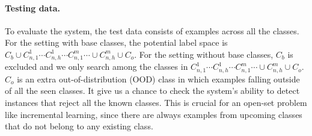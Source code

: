 \documentclass[11pt]{article}
\begin{document}
\paragraph{Testing data.}
To evaluate the system, the test data consists of examples across all the classes. For the setting with base classes, the potential label space is  $C_b\cup C_{n,1}^1\cdots C_{n,h}^1 \cdots C_{n,1}^m\cdots \cup C_{n,h}^m \cup C_o$. For the setting without base classes, $C_b$ is excluded and we only search among the classes in $C_{n,1}^1\cdots C_{n,h}^1 \cdots C_{n,1}^m\cdots \cup C_{n,h}^m \cup C_o$.
$C_o$ is an extra out-of-distribution (OOD) class in which examples falling outside of all the seen classes. It give us a chance to check the system's ability to detect instances that reject all the known classes.
This is crucial for an open-set problem like incremental learning, since there are always examples from upcoming classes that do not belong to any existing class.
\end{document}
